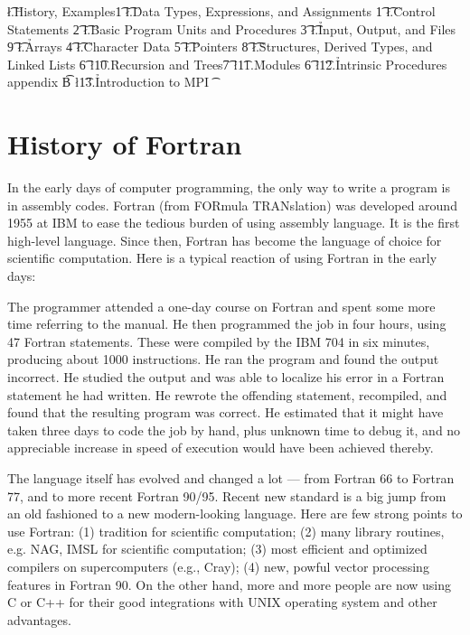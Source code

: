 {{
\smallskip
\l{\t{}.\h History, Examples\hfill 1\t}
\l{\t{}.\h Data Types, Expressions, and Assignments \hfill 1\t}
\l{\t{}.\h Control Statements \hfill  2\t}
\l{\t{}.\h Basic Program Units and Procedures \hfill 3\t}
\l{\t{}.\h Input, Output, and Files \hfill 9\t}
\l{\t{}.\h Arrays \hfill 4\t}
\l{\t{}.\h Character Data \hfill 5\t}
\l{\t{}.\h Pointers \hfill 8\t}
\l{\t{}.\h Structures, Derived Types, and Linked Lists \hfill 6\t}
\l{\t 10.\h Recursion  and Trees\hfill 7\t}
\l{\t 11.\h Modules \hfill 6\t}
\l{\t 12.\h Intrinsic Procedures \hfill appendix B\t}
\l{\t 13.\h Introduction to MPI \hfill \t}

\vfill\eject
}

\section{History of Fortran}

In the early days of computer programming, the only way to write a program
is in assembly codes.   Fortran (from FORmula TRANslation) was
developed around 1955 at IBM to ease the tedious burden of using
assembly language.  It is the first high-\-level language.
Since then, Fortran has become the language of
choice for scientific computation.  Here is a typical reaction of
using Fortran in the early days:
\smallskip
{\parindent 1cm\narrower
\noindent The programmer attended a one-day course on Fortran and spent 
some more
time referring to the manual.  He then programmed the job in four hours,
using 47 Fortran statements.  These were compiled by the IBM 704 in
six minutes, producing about 1000 instructions.  He ran the program
and found the output incorrect.  He studied the output and was able
to localize his error in a Fortran statement he had written.  He rewrote
the offending statement, recompiled, and found that the resulting
program was correct.  He estimated that it might have taken three days
to code the job by hand, plus unknown time to debug it, and no appreciable
increase in speed of execution would have been achieved thereby.\par}

\smallskip
The language itself has evolved
and changed a lot ---  from Fortran 66 to Fortran 77, and to more recent
Fortran 90/95.   Recent new standard is a big jump from an old fashioned
to a new modern-looking language.   Here are few strong points to use
Fortran: (1) tradition for scientific computation; (2) many library
routines, e.g. NAG, IMSL for scientific computation; (3) most efficient
and optimized compilers on supercomputers (e.g., Cray); (4) new, powful
vector processing features in Fortran 90.   On the other hand, more
and more people are now using C or C++ for their good integrations with
UNIX operating system and other advantages.

}
